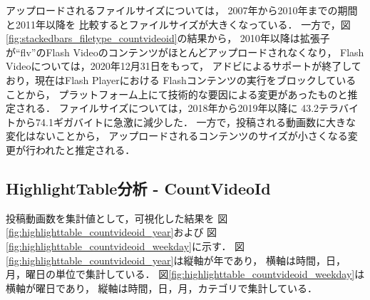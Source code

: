 \documentclass[submit,techrep,noauthor]{ipsj}
\begin{document}
アップロードされるファイルサイズについては，
2007年から2010年までの期間と2011年以降を
比較するとファイルサイズが大きくなっている．
%
一方で，図\ref{fig:stackedbars_filetype_countvideoid}の結果から，
2010年以降は拡張子が``flv''のFlash Videoのコンテンツがほとんどアップロードされなくなり，
%
Flash Videoについては，2020年12月31日をもって，
アドビによるサポートが終了しており，現在はFlash Playerにおける
Flashコンテンツの実行をブロックしていることから，
プラットフォーム上にて技術的な要因による変更があったものと推定される．
%
ファイルサイズについては，2018年から2019年以降に
43.2テラバイトから74.1ギガバイトに急激に減少した．
一方で，投稿される動画数に大きな変化はないことから，
アップロードされるコンテンツのサイズが小さくなる変更が行われたと推定される．

\newpage
\subsection{HighlightTable分析 - CountVideoId}
投稿動画数を集計値として，可視化した結果を
図\ref{fig:highlighttable_countvideoid_year}および
図\ref{fig:highlighttable_countvideoid_weekday}に示す．
%
図\ref{fig:highlighttable_countvideoid_year}は縦軸が年であり，
横軸は時間，日，月，曜日の単位で集計している．
図\ref{fig:highlighttable_countvideoid_weekday}は横軸が曜日であり，
縦軸は時間，日，月，カテゴリで集計している．
\end{document}
